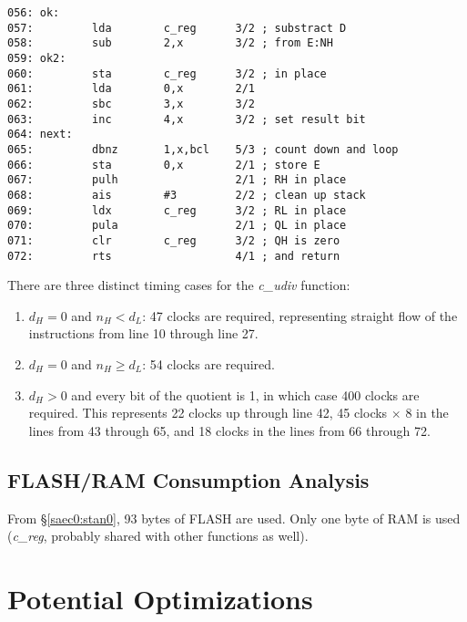 \documentclass[letterpaper,10pt,titlepage]{article}
\begin{document}
\begin{verbatim}
056: ok:
057:         lda        c_reg      3/2 ; substract D
058:         sub        2,x        3/2 ; from E:NH
059: ok2:
060:         sta        c_reg      3/2 ; in place
061:         lda        0,x        2/1
062:         sbc        3,x        3/2
063:         inc        4,x        3/2 ; set result bit
064: next:
065:         dbnz       1,x,bcl    5/3 ; count down and loop
066:         sta        0,x        2/1 ; store E
067:         pulh                  2/1 ; RH in place
068:         ais        #3         2/2 ; clean up stack
069:         ldx        c_reg      3/2 ; RL in place
070:         pula                  2/1 ; QL in place
071:         clr        c_reg      3/2 ; QH is zero
072:         rts                   4/1 ; and return
\end{verbatim}

There are three distinct timing cases for the \emph{c\_udiv} function:

\begin{enumerate}
\item $d_H = 0$ and $n_H < d_L$:
      47 clocks are required, representing straight flow of the 
      instructions from line 10 through line 27.
\item $d_H = 0$ and $n_H \geq d_L$:  54 clocks are required.
\item $d_H > 0$ and every bit of the quotient is 1, in which case
      400 clocks are required.  This represents 22 clocks up through
      line 42, 45 clocks $\times$ 8 in the lines from 43 through 65, and
      18 clocks in the lines from 66 through 72.
\end{enumerate}



\subsection{FLASH/RAM Consumption Analysis}
\label{saec0:sfra0}

From \S{}\ref{saec0:stan0}, 93 bytes of FLASH are used.  Only one byte
of RAM is used (\emph{c\_reg}, probably shared with other functions
as well).



\section{Potential Optimizations}
\label{spop0}
\end{document}
